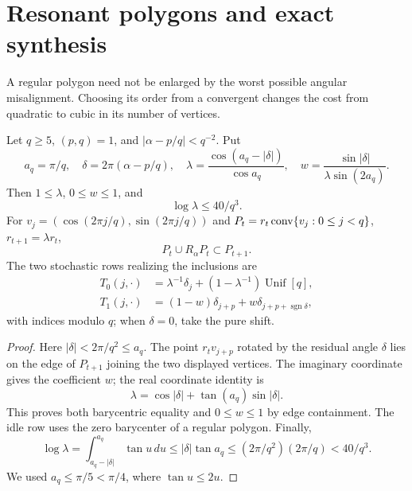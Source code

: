 \section{Resonant polygons and exact synthesis}\label{sec:resonance}
A regular polygon need not be enlarged by the worst possible angular
misalignment. Choosing its order from a convergent changes the cost from
quadratic to cubic in its number of vertices.

\begin{lemma}\label{lem:resonance}
Let $q\ge5$, $(p,q)=1$, and $|\alpha-p/q|<q^{-2}$. Put
\[
 a_q=\pi/q,\quad \delta=2\pi(\alpha-p/q),\quad
 \lambda=\frac{\cos(a_q-|\delta|)}{\cos a_q},\quad
 w=\frac{\sin|\delta|}{\lambda\sin(2a_q)}.
\]
Then $1\le\lambda$, $0\le w\le1$, and
\begin{equation}\label{eq:lambda}
                         \log\lambda\le40/q^3.
\end{equation}
For $v_j=(\cos(2\pi j/q),\sin(2\pi j/q))$ and
$P_t=r_t\operatorname{conv}\{v_j:0\le j<q\}$, $r_{t+1}=\lambda r_t$,
\[
                         P_t\cup R_\alpha P_t\subset P_{t+1}.
\]
The two stochastic rows realizing the inclusions are
\begin{align}
 T_0(j,\cdot)&=\lambda^{-1}\delta_j
                      +(1-\lambda^{-1})\operatorname{Unif}[q],
                                                        \label{eq:idle-row}\\
 T_1(j,\cdot)&=(1-w)\delta_{j+p}+w\delta_{j+p+\operatorname{sgn}\delta},
                                                        \label{eq:rotate-row}
\end{align}
with indices modulo $q$; when $\delta=0$, take the pure shift.
\end{lemma}
\begin{proof}
Here $|\delta|<2\pi/q^2\le a_q$. The point $r_tv_{j+p}$ rotated
by the residual angle $\delta$ lies on the edge of $P_{t+1}$ joining
the two displayed vertices. The imaginary coordinate gives the coefficient
$w$; the real coordinate identity is
\[
              \lambda=\cos|\delta|+\tan(a_q)\sin|\delta|.
\]
This proves both barycentric equality and $0\le w\le1$ by edge
containment. The idle row uses the zero barycenter of a regular polygon.
Finally,
\[
 \log\lambda=\int_{a_q-|\delta|}^{a_q}\tan u\,du
       \le |\delta|\tan a_q
       \le(2\pi/q^2)(2\pi/q)<40/q^3.
\]
We used $a_q\le\pi/5<\pi/4$, where $\tan u\le2u$.
\end{proof}

